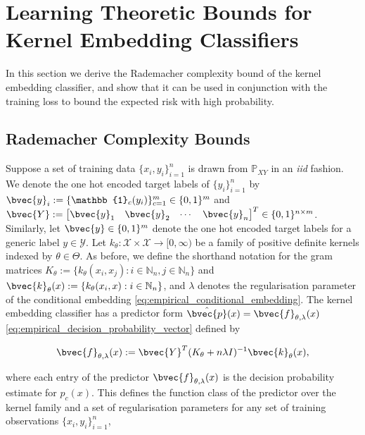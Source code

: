 \documentclass{article}
\begin{document}
\newpage
\section{Learning Theoretic Bounds for Kernel Embedding Classifiers}
\label{app:learning_theoretic_bounds}

	In this section we derive the Rademacher complexity bound of the kernel embedding classifier, and show that it can be used in conjunction with the training loss to bound the expected risk with high probability.
		
	\subsection{Rademacher Complexity Bounds}
	\label{app:rademacher_complexity_theorems}

		Suppose a set of training data $\{x_{i}, y_{i}\}_{i = 1}^{n}$ is drawn from $\mathbb{P}_{X Y}$ in an \textit{iid} fashion. We denote the one hot encoded target labels of $\{y_{i}\}_{i = 1}^{n}$ by $\bvec{y}_{i} := \{\mathbb{1}_{c}(y_{i})\}_{c = 1}^{m} \in \{0, 1\}^{m}$ and $\bvec{Y} := \begin{bmatrix} \bvec{y}_{1} & \bvec{y}_{2} & \cdots & \bvec{y}_{n} \end{bmatrix}^{T} \in \{0, 1\}^{n \times m}$. Similarly, let $\bvec{y} \in \{0, 1\}^{m}$ denote the one hot encoded target labels for a generic label $y \in \mathcal{Y}$. Let $k_{\theta} : \mathcal{X} \times \mathcal{X} \to [0, \infty)$ be a family of positive definite kernels indexed by $\theta \in \Theta$. As before, we define the shorthand notation for the gram matrices $K_{\theta} := \{k_{\theta}(x_{i}, x_{j}) : i \in \mathbb{N}_{n}, j \in \mathbb{N}_{n}\}$ and $\bvec{k}_{\theta}(x) := \{k_{\theta}(x_{i}, x) : i \in \mathbb{N}_{n}\}$, and $\lambda$ denotes the regularisation parameter of the conditional embedding \eqref{eq:empirical_conditional_embedding}. The kernel embedding classifier has a predictor form $\hat{\bvec{p}}(x) = \bvec{f}_{\theta, \lambda}(x)$ \eqref{eq:empirical_decision_probability_vector} defined by
	
		\begin{equation}
			\bvec{f}_{\theta, \lambda}(x) := \bvec{Y}^{T} (K_{\theta} + n \lambda I)^{-1} \bvec{k}_{\theta}(x),
		\label{eq:predictor}
		\end{equation}
		
		where each entry of the predictor $\bvec{f}_{\theta, \lambda}(x)$ is the decision probability estimate for $p_{c}(x)$. This defines the function class of the predictor over the kernel family and a set of regularisation parameters for any set of training observations $\{x_{i}, y_{i}\}_{i = 1}^{n}$,
		
\end{document}
